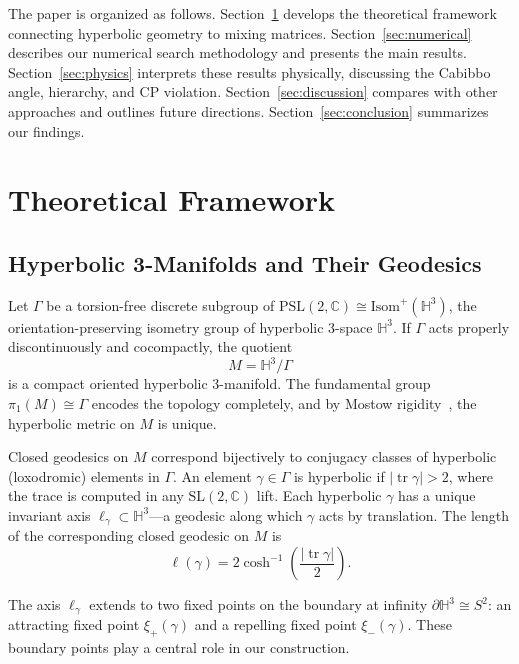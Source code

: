 \documentclass[11pt,a4paper]{article}
\newcommand{\Hthree}{\mathbb{H}^3}
\newcommand{\SL}{\mathrm{SL}}
\newcommand{\tr}{\operatorname{tr}}
\begin{document}
The paper is organized as follows. Section~\ref{sec:framework} develops 
the theoretical framework connecting hyperbolic geometry to mixing 
matrices. Section~\ref{sec:numerical} describes our numerical search 
methodology and presents the main results. Section~\ref{sec:physics} 
interprets these results physically, discussing the Cabibbo angle, 
hierarchy, and CP violation. Section~\ref{sec:discussion} compares 
with other approaches and outlines future directions. 
Section~\ref{sec:conclusion} summarizes our findings.

\section{Theoretical Framework}
\label{sec:framework}

\subsection{Hyperbolic 3-Manifolds and Their Geodesics}
\label{subsec:hyperbolic}

Let $\Gamma$ be a torsion-free discrete subgroup of 
$\mathrm{PSL}(2,\mathbb{C}) \cong \mathrm{Isom}^+(\Hthree)$, the 
orientation-preserving isometry group of hyperbolic 3-space $\Hthree$. 
If $\Gamma$ acts properly discontinuously and cocompactly, the quotient
\begin{equation}
M = \Hthree / \Gamma
\end{equation}
is a compact oriented hyperbolic 3-manifold. The fundamental group 
$\pi_1(M) \cong \Gamma$ encodes the topology completely, and by Mostow 
rigidity~\cite{Mostow1968}, the hyperbolic metric on $M$ is unique.

Closed geodesics on $M$ correspond bijectively to conjugacy classes of 
hyperbolic (loxodromic) elements in $\Gamma$. An element 
$\gamma \in \Gamma$ is hyperbolic if $|\tr \gamma| > 2$, where the 
trace is computed in any $\SL(2,\mathbb{C})$ lift. Each hyperbolic 
$\gamma$ has a unique invariant axis $\ell_\gamma \subset \Hthree$---a 
geodesic along which $\gamma$ acts by translation. The length of the 
corresponding closed geodesic on $M$ is
\begin{equation}
\ell(\gamma) = 2 \cosh^{-1}\left( \frac{|\tr \gamma|}{2} \right).
\end{equation}

The axis $\ell_\gamma$ extends to two fixed points on the boundary at 
infinity $\partial \Hthree \cong S^2$: an attracting fixed point 
$\xi_+(\gamma)$ and a repelling fixed point $\xi_-(\gamma)$. These 
boundary points play a central role in our construction.
\end{document}
